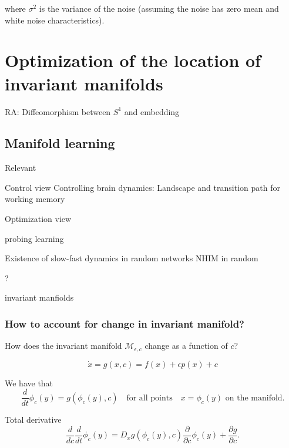 \documentclass{article}
\theoremstyle{definition} \newtheorem{definition}{Definition}
\theoremstyle{remark} \newtheorem{remark}{Remark}
\newcommand{\manifold}{\mathcal{M}}
\newcounter{ct}
\begin{document}
where \( \sigma^2 \) is the variance of the noise (assuming the noise has zero mean and white noise characteristics).




\section{Optimization of the location of invariant manifolds} %
\citep{agrachev2009controllability,agrachev2022control}

RA: Diffeomorphism between $S^1$  and embedding

\citep{ocko2018emergent}

\subsection{Manifold learning}
\citep{huys2014functional}
Relevant \citep{chang2023novo}

Control view
Controlling brain dynamics: Landscape and transition path for working memory \citep{ye2023wm}

Optimization view \citep{hennig2021learningoptimization}

probing learning \citep{marschall2023probing}

Existence of slow-fast dynamics in random networks \citep{schmalfuss2008invariant, shaham2017slow}
NHIM in random \citep{li2013normally}

? \citep{federer2018self}

invariant manfiolds \citep{guckenheimer2015invariant}

\subsubsection{How to account for change in invariant manifold?}
How does the invariant manifold $\manifold_{\epsilon,c}$ change as a function of $c$?

\begin{equation}
\dot x = g(x,c) = f(x) + \epsilon p(x) + c
\end{equation}

We have that 
\begin{equation}
\frac{d}{dt} \phi_c(y) =g(\phi_c(y), c) \quad \text{for all points} \quad x = \phi_c(y) \text{ on the manifold}.
\end{equation}

Total derivative
\begin{equation}
\frac{d}{dc} \frac{d}{dt} \phi_c(y) = D_x g(\phi_c(y), c) \frac{\partial}{\partial c} \phi_c(y) + \frac{\partial g}{\partial c}.
\end{equation}
\end{document}
